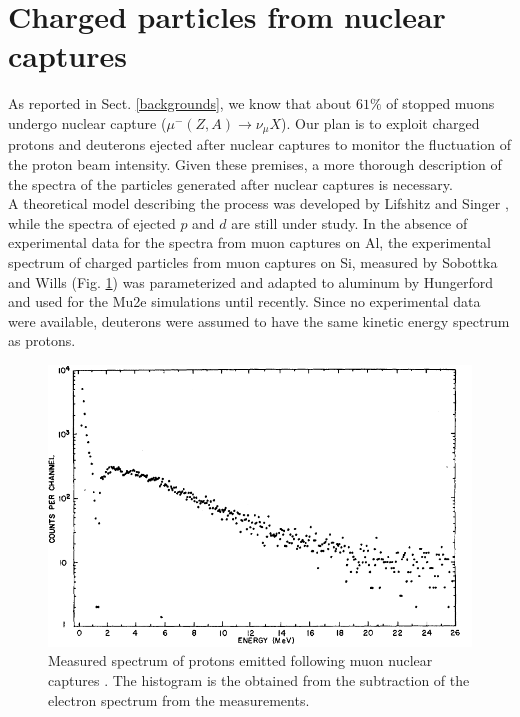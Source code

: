 \documentclass[12pt,a4paper,openright, oneside, titlepage]{book} %
\begin{document}
\section{Charged particles from nuclear captures}
As reported in Sect. \ref{backgrounds}, 
we know that about $61\%$ of stopped muons undergo nuclear capture ($\mu^-(Z,A)\rightarrow \nu_\mu X$). 
Our plan is to exploit charged protons and deuterons ejected after nuclear captures 
to monitor the fluctuation of the proton beam intensity. 
Given these premises, 
a more thorough description of the spectra of the particles generated after nuclear captures is necessary.\\
A theoretical model describing the process was developed by Lifshitz and Singer \cite{Lifshitz}, 
while the spectra of ejected $p$ and $d$ are still under study. 
In the absence of experimental data for the spectra from muon captures on Al, 
the experimental spectrum of charged particles from muon captures on Si, 
measured by Sobottka and Wills \cite{Sobottka} (Fig. \ref{_sobottka}) 
was parameterized and adapted to aluminum by Hungerford \cite{Hungerford} 
and used for the Mu2e simulations until recently. 
Since no experimental data were available, 
deuterons were assumed to have the same kinetic energy spectrum as protons.\\

\begin{figure}
\centering
\includegraphics[scale=0.8]{sobottka}
\caption{Measured spectrum of protons emitted following muon nuclear captures \cite{Sobottka}. 
The histogram is the obtained from the subtraction of the electron spectrum from the measurements.}
\label{_sobottka}
\end{figure}
\end{document}
